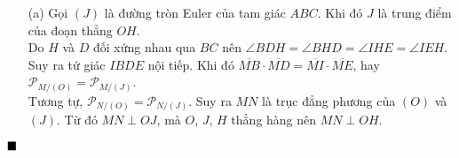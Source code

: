 \documentclass{article} %
\newenvironment{solution}[1][Lời giải]{%
  \proof[\faPenNib \hspace{0.2cm} \ttfamily \scshape \large #1]%
}{\(\hfill \blacksquare\){\parfillskip0pt\par}}
\begin{document}
        \begin{solution}
            \hfill
            \begin{itemize}
                \item[(a)] Gọi \((J)\) là đường tròn Euler của tam giác \(ABC\). Khi đó \(J\) là trung điểm của đoạn thẳng \(OH\).\\
                Do \(H\) và \(D\) đối xứng nhau qua \(BC\) nên \(\angle BDH = \angle BHD = \angle IHE = \angle IEH\). Suy ra tứ giác \(IBDE\) nội tiếp. Khi đó \(\overline{MB} \cdot \overline{MD} = \overline{MI} \cdot \overline{ME}\), hay \(\mathcal{P}_{M/(O)} = \mathcal{P}_{M/(J)}\).\\
                Tương tự, \(\mathcal{P}_{N/(O)} = \mathcal{P}_{N/(J)}\). Suy ra \(MN\) là trục đẳng phương của \((O)\) và \((J)\). Từ đó \(MN \perp OJ\), mà \(O\), \(J\), \(H\) thẳng hàng nên \(MN \perp OH\).


\end{itemize}
\end{solution}
\end{document}
